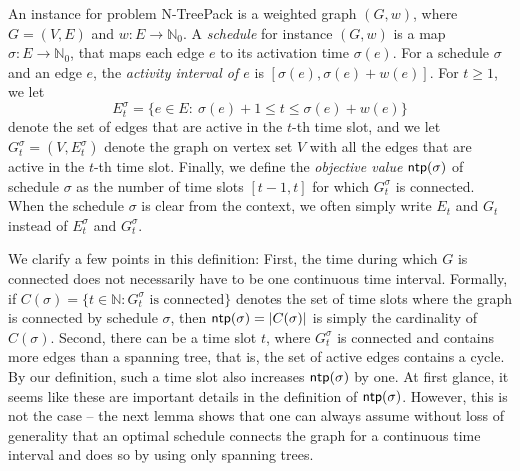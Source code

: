 \documentclass[runningheads]{llncs}
\newcommand{\NN}{\mathbb{N}}
\newcommand{\set}[1]{\{ #1 \}}
\newcommand{\xxxNTP}{{\sc N-TreePack}}
\DeclareMathOperator{\ntp}{\text{\sf ntp}}
\newcommand{\lasse}[1]{#1}
\begin{document}
An instance for problem {\xxxNTP} is a weighted graph $(G,w)$, where $G=(V,E)$ and $w:E\to\NN_0$. 
A \emph{schedule} for instance $(G,w)$ is a map $\sigma:E\to\NN_0$, that maps each edge $e$ to 
its activation time $\sigma(e)$.
For a schedule $\sigma$ and an edge $e$, the \emph{activity interval of $e$} is $[\sigma(e),\sigma(e)+w(e)]$. 
For $t\ge1$, we let 
\[E^\sigma_t= \set{e\in E:~ \sigma(e)+1 \le t \le \sigma(e)+w(e)}\]
 denote 
the set of edges that are active in the $t$-th time slot, and we let $G^\sigma_t=(V,E^\sigma_t)$ 
denote the graph on vertex set $V$ with all the edges that are active in the $t$-th time slot. 
Finally, we define the \emph{objective value} $\ntp(\sigma)$ of schedule $\sigma$ as the number of time 
slots $[t-1,t]$ for which $G^\sigma_t$ is connected. When the schedule $\sigma$ is clear from the context, we often simply write $E_t$ and $G_t$ instead of 
$E^\sigma_t$ and $G^\sigma_t$. 

 \lasse{We clarify a few points in this definition: 
First, the time during which $G$ is connected does not necessarily have to be one continuous time interval. Formally, if $C(\sigma) = \set{t \in \NN : G^\sigma_t \text{ is connected}}$ denotes the set of time slots where the graph is connected by schedule $\sigma$, then $\ntp(\sigma) = |C(\sigma)|$ is simply the cardinality of $C(\sigma)$. 
Second, there can be a time slot $t$, where $G^\sigma_t$ is connected and contains more edges than a spanning tree, that is, the set of active edges contains a cycle. 
By our definition, such a time slot also increases $\ntp(\sigma)$ by one. 
At first glance, it seems like these are important details in the definition of $\ntp(\sigma)$. 
However, this is not the case -- the next lemma shows that one can always assume without loss of generality that an optimal schedule connects the graph for a continuous time interval and does so by using only spanning trees. }



\end{document}
